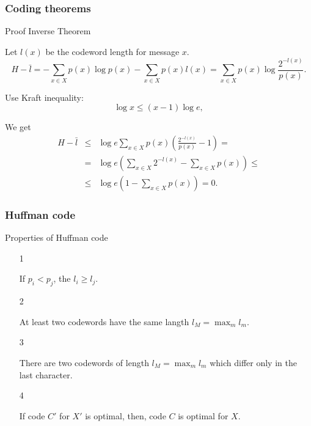 \documentclass[14pt]{beamer}
\begin{document}
\begin{frame}
\frametitle{Coding theorems}
Proof Inverse Theorem
\begin{itemize}    
\footnotesize {

    \item Let $l(x)$ be the codeword length for message $x$. 
    \[
    H - \bar {l} = - \sum\limits_{x \in X} {p(x)\log p(x)} - \sum\limits_{x \in
    X} {p(x)l(x) = \sum\limits_{x \in X} {p(x)\log \frac{2^{ - l(x)}}{p(x)}} }
    .
    \]
    \item Use Kraft inequality:
    \[
    \log x \le (x - 1)\log e,
    \]

    \item We get
    \begin{eqnarray}
    \label{part2eq4} H - \bar {l} &\le& \log e\sum\limits_{x \in X} 
    {p(x)\left( {\frac{2^{ - l(x)}}{p(x)} - 1} \right)} =\nonumber\\
    &=& \log e\left( {\sum\limits_{x \in X} {2^{ - l(x)}} - \sum\limits_{x \in X} {p(x)} } \right)\le \nonumber\\ 
    & \le& \log e\left( {1 - \sum\limits_{x \in X} {p(x)} } \right) = 0.
    \end{eqnarray}
}
\end{itemize}
\end{frame}


\begin{frame}
\frametitle{Huffman code}
Properties of Huffman code
\begin{itemize}    

    \item[1]
    \begin{prop} If $p_i < p_j $, the $l_i \ge l_j $.
    \label{HProp1}
    \end{prop}
    
    \item[2]
    \begin{prop}
    \label{HProp2} At least two codewords have the same langth
    $l_M = \max _m l_m $.
    \end{prop}
    
    \item[3]
    \begin{prop}
    \label{HProp3} There are two codewords of length $l_M = \max _m l_m $ which differ only in the last character.
    \end{prop}
    
    \item[4]
    \begin{prop}
    \label{HProp4} If code $C'$ for $X'$ is optimal, then, code $C$
    is optimal for  $X$.
    \end{prop}

\end{itemize}
\end{frame}
\end{document}
